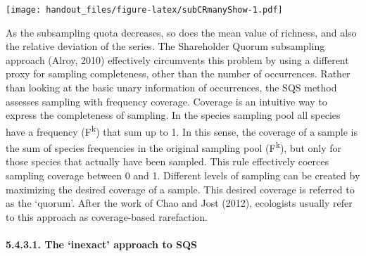 \documentclass[]{article}
\newenvironment{Shaded}{\begin{snugshade}}{\end{snugshade}}
\newcommand{\ControlFlowTok}[1]{\textcolor[rgb]{0.13,0.29,0.53}{\textbf{#1}}}
\newcommand{\DataTypeTok}[1]{\textcolor[rgb]{0.13,0.29,0.53}{#1}}
\newcommand{\DecValTok}[1]{\textcolor[rgb]{0.00,0.00,0.81}{#1}}
\newcommand{\KeywordTok}[1]{\textcolor[rgb]{0.13,0.29,0.53}{\textbf{#1}}}
\newcommand{\NormalTok}[1]{#1}
\newcommand{\OperatorTok}[1]{\textcolor[rgb]{0.81,0.36,0.00}{\textbf{#1}}}
\newcommand{\StringTok}[1]{\textcolor[rgb]{0.31,0.60,0.02}{#1}}
\let\oldparagraph\paragraph
\renewcommand{\paragraph}[1]{\oldparagraph{#1}\mbox{}}
\begin{document}
\begin{Shaded}
\end{Shaded}

\texttt{[image: handout\_files/figure-latex/subCRmanyShow-1.pdf]}

As the subsampling quota decreases, so does the mean value of richness,
and also the relative deviation of the series. The Shareholder Quorum
subsampling approach (Alroy, 2010) effectively circumvents this problem
by using a different proxy for sampling completeness, other than the
number of occurrences. Rather than looking at the basic unary
information of occurrences, the SQS method assesses sampling with
frequency coverage. Coverage is an intuitive way to express the
completeness of sampling. In the species sampling pool all species have
a frequency (F\textsuperscript{k}) that sum up to 1. In this sense, the
coverage of a sample is the sum of species frequencies in the original
sampling pool (F\textsuperscript{k}), but only for those species that
actually have been sampled. This rule effectively coerces sampling
coverage between 0 and 1. Different levels of sampling can be created by
maximizing the desired coverage of a sample. This desired coverage is
referred to as the `quorum'. After the work of Chao and Jost (2012),
ecologists usually refer to this approach as coverage-based rarefaction.

\hypertarget{the-inexact-approach-to-sqs}{%
\paragraph{5.4.3.1. The `inexact' approach to
SQS}\label{the-inexact-approach-to-sqs}}
\end{document}
